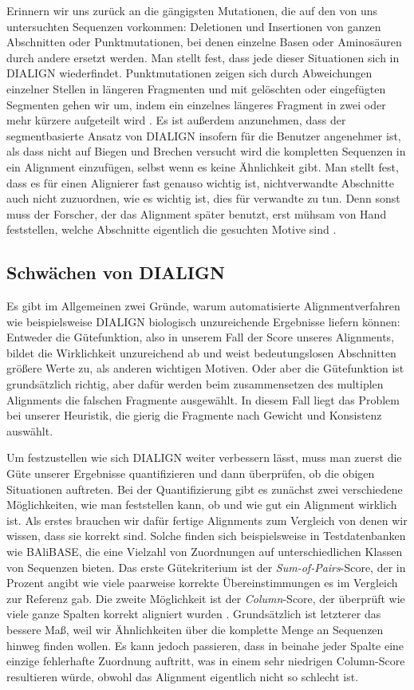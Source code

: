 Erinnern wir uns zurück an die gängigsten Mutationen, die auf den von uns untersuchten Sequenzen vorkommen: Deletionen und Insertionen von ganzen Abschnitten oder Punktmutationen, bei denen einzelne Basen oder Aminosäuren durch andere ersetzt werden. Man stellt fest, dass jede dieser Situationen sich in DIALIGN wiederfindet. Punktmutationen zeigen sich durch Abweichungen einzelner Stellen in längeren Fragmenten und mit gelöschten oder eingefügten Segmenten gehen wir um, indem ein einzelnes längeres Fragment in zwei oder mehr kürzere aufgeteilt wird \citep{mfdw98}. Es ist außerdem anzunehmen, dass der segmentbasierte Ansatz von DIALIGN insofern für die Benutzer angenehmer ist, als dass nicht auf Biegen und Brechen versucht wird die kompletten Sequenzen in ein Alignment einzufügen, selbst wenn es keine Ähnlichkeit gibt. Man stellt fest, dass es für einen Alignierer fast genauso wichtig ist, nichtverwandte Abschnitte auch nicht zuzuordnen, wie es wichtig ist, dies für verwandte zu tun. Denn sonst muss der Forscher, der das Alignment später benutzt, erst mühsam von Hand feststellen, welche Abschnitte eigentlich die gesuchten Motive sind \citep{m99}.

\subsection{Schwächen von DIALIGN}

Es gibt im Allgemeinen zwei Gründe, warum automatisierte Alignmentverfahren wie beispielsweise DIALIGN biologisch unzureichende Ergebnisse liefern können: Entweder die Gütefunktion, also in unserem Fall der Score unseres Alignments, bildet die Wirklichkeit unzureichend ab und weist bedeutungslosen Abschnitten größere Werte zu, als anderen wichtigen Motiven. Oder aber die Gütefunktion ist grundsätzlich richtig, aber dafür werden beim zusammensetzen des multiplen Alignments die falschen Fragmente ausgewählt. In diesem Fall liegt das Problem bei unserer Heuristik, die gierig die Fragmente nach Gewicht und Konsistenz auswählt. 

Um festzustellen wie sich DIALIGN weiter verbessern lässt, muss man zuerst die Güte unserer Ergebnisse quantifizieren und dann überprüfen, ob die obigen Situationen auftreten. Bei der Quantifizierung gibt es zunächst zwei verschiedene Möglichkeiten, wie man feststellen kann, ob und wie gut ein Alignment wirklich ist. Als erstes brauchen wir dafür fertige Alignments zum Vergleich von denen wir wissen, dass sie korrekt sind. Solche finden sich beispielsweise in Testdatenbanken wie BAliBASE, die eine Vielzahl von Zuordnungen auf unterschiedlichen Klassen von Sequenzen bieten. Das erste Gütekriterium ist der \emph{Sum-of-Pairs}-Score, der in Prozent angibt wie viele paarweise korrekte Übereinstimmungen es im Vergleich zur Referenz gab. Die zweite Möglichkeit ist der \emph{Column}-Score, der überprüft wie viele ganze Spalten korrekt aligniert wurden \citep{mpps06}. Grundsätzlich ist letzterer das bessere Maß, weil wir Ähnlichkeiten über die komplette Menge an Sequenzen hinweg finden wollen. Es kann jedoch passieren, dass in beinahe jeder Spalte eine einzige fehlerhafte Zuordnung auftritt, was in einem sehr niedrigen Column-Score resultieren würde, obwohl das Alignment eigentlich nicht so schlecht ist.

